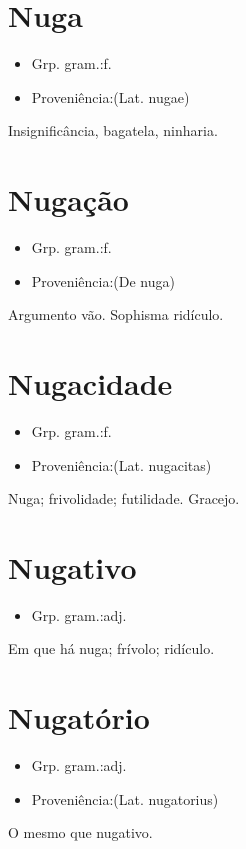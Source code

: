 \section{Nuga}
\begin{itemize}
\item {Grp. gram.:f.}
\end{itemize}
\begin{itemize}
\item {Proveniência:(Lat. \textunderscore nugae\textunderscore )}
\end{itemize}
Insignificância, bagatela, ninharia.
\section{Nugação}
\begin{itemize}
\item {Grp. gram.:f.}
\end{itemize}
\begin{itemize}
\item {Proveniência:(De \textunderscore nuga\textunderscore )}
\end{itemize}
Argumento vão.
Sophisma ridículo.
\section{Nugacidade}
\begin{itemize}
\item {Grp. gram.:f.}
\end{itemize}
\begin{itemize}
\item {Proveniência:(Lat. \textunderscore nugacitas\textunderscore )}
\end{itemize}
Nuga; frivolidade; futilidade.
Gracejo.
\section{Nugativo}
\begin{itemize}
\item {Grp. gram.:adj.}
\end{itemize}
Em que há nuga; frívolo; ridículo.
\section{Nugatório}
\begin{itemize}
\item {Grp. gram.:adj.}
\end{itemize}
\begin{itemize}
\item {Proveniência:(Lat. \textunderscore nugatorius\textunderscore )}
\end{itemize}
O mesmo que \textunderscore nugativo\textunderscore .
